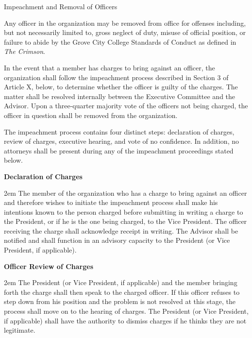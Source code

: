 {
	\begin{article}{Impeachment and Removal of Officers}
		\item Any officer in the organization may be removed from office for offenses including, but not necessarily limited to, gross neglect of duty, misuse of official position, or failure to abide by the Grove City College Standards of Conduct as defined in \textit{The Crimson}.
		\item In the event that a member has charges to bring against an officer, the organization shall follow the impeachment process described in Section 3 of Article X, below, to determine whether the officer is guilty of the charges. The matter shall be resolved internally between the Executive Committee and the Advisor. Upon a three-quarter majority vote of the officers not being charged, the officer in question shall be removed from the organization.
		\item The impeachment process contains four distinct steps: declaration of charges, review of charges, executive hearing, and vote of no confidence.  In addition, no attorneys shall be present during any of the impeachment proceedings stated below.
			
		\hypertarget{Declaration of Charges}{}
		\textbf{Declaration of Charges}
		
		\begin{adjustwidth*}{}{2em}
			The member of the organization who has a charge to bring against an officer and therefore wishes to initiate the impeachment process shall make his intentions known to the person charged before submitting in writing a charge to the President, or if he is the one being charged, to the Vice President. The officer receiving the charge shall acknowledge receipt in writing. The Advisor shall be notified and shall function in an advisory capacity to the President (or Vice President, if applicable).
		\end{adjustwidth*}
	
		\hypertarget{Officer Review of Charges}{}
		\textbf{Officer Review of Charges}
		
		\begin{adjustwidth*}{}{2em}
			The President (or Vice President, if applicable) and the member bringing forth the charge shall then speak to the charged officer. If this officer refuses to step down from his position and the problem is not resolved at this stage, the process shall move on to the hearing of charges. The President (or Vice President, if applicable) shall have the authority to dismiss charges if he thinks they are not legitimate.
		\end{adjustwidth*}
	

\end{article}}
